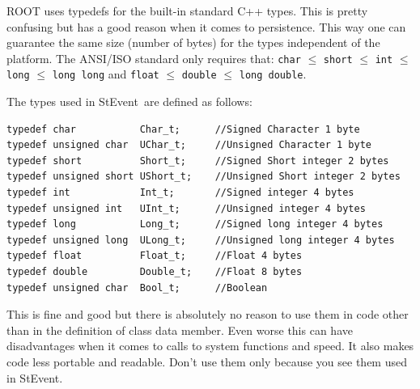 \documentclass[twoside]{article}
\newcommand{\StEvent}{\textsf{StEvent}}
\begin{document}
ROOT uses typedefs for the built-in standard C++ types. This is pretty
confusing but has a good reason when it comes to persistence. This way
one can guarantee the same size (number of bytes) for the types
independent of the platform.  The ANSI/ISO standard only requires
that: \texttt{char} $\le$ \texttt{short} $\le$ \texttt{int} $\le$
\texttt{long} $\le$ \texttt{long long} and \texttt{float} $\le$
\texttt{double} $\le$ \texttt{long double}.

The types used in \StEvent\ are defined as follows:
\begin{verbatim}
typedef char           Char_t;      //Signed Character 1 byte
typedef unsigned char  UChar_t;     //Unsigned Character 1 byte
typedef short          Short_t;     //Signed Short integer 2 bytes
typedef unsigned short UShort_t;    //Unsigned Short integer 2 bytes
typedef int            Int_t;       //Signed integer 4 bytes
typedef unsigned int   UInt_t;      //Unsigned integer 4 bytes
typedef long           Long_t;      //Signed long integer 4 bytes
typedef unsigned long  ULong_t;     //Unsigned long integer 4 bytes
typedef float          Float_t;     //Float 4 bytes
typedef double         Double_t;    //Float 8 bytes
typedef unsigned char  Bool_t;      //Boolean
\end{verbatim}

This is fine and good but there is absolutely no reason to use them in
code other than in the definition of class data member. Even worse
this can have disadvantages when it comes to calls to system functions
and speed. It also makes code less portable and readable.  Don't use
them only because you see them used in \StEvent.
\end{document}
